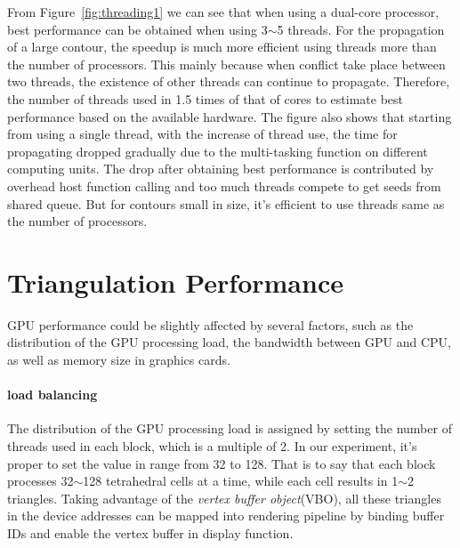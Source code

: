 \documentclass[11pt, b5paper]{report}
\begin{document}
From Figure~\ref{fig:threading1} we can see that when using a dual-core 
processor, best performance can be obtained when using 3$\sim$5 threads.
For the propagation of a large contour, the speedup is much
more efficient using threads more than the number of processors.
This mainly because when conflict take place between two threads, the 
existence of other threads can continue to propagate.
Therefore, the number of threads used in 1.5 times of that of cores to estimate
best performance based on the available hardware.
The figure also shows that starting from using a single 
thread, with the increase of thread use, the time for propagating 
dropped gradually due to the multi-tasking function on different computing units.
The drop after obtaining best performance is contributed by overhead host function
calling and too much threads compete to get seeds from shared queue.
But for contours small in size, it's efficient to use threads same as the number 
of processors.



\section{Triangulation Performance}

GPU performance could be slightly affected by several factors, such as the 
distribution of the GPU processing load, the bandwidth between GPU and CPU, 
as well as memory size in graphics cards.

\paragraph{load balancing}
The distribution of the GPU processing load is assigned by setting the number of 
threads used in each block, which is a multiple of 2. In our experiment, it's
proper to set the value in range from 32 to 128. That is to say that each block 
processes 32$\sim$128 tetrahedral cells at a time, while each cell results in 
1$\sim$2 triangles.
Taking advantage of the \emph{vertex buffer object}(VBO), all these triangles in
the device addresses can be mapped into rendering pipeline by binding buffer 
IDs and enable the vertex buffer in display function.
\end{document}
